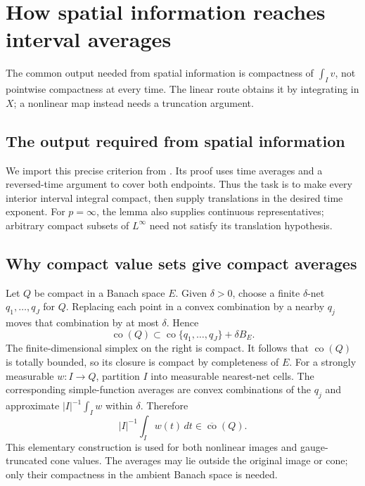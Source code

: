 \documentclass[12pt,reqno]{amsart}
\begin{document}
\section{How spatial information reaches interval averages}
The common output needed from spatial information is compactness of $\int_Iv$, not pointwise compactness at every time. The linear route obtains it by integrating in $X$; a nonlinear map instead needs a truncation argument.
\subsection{The output required from spatial information}
\begin{lemma}[Simon]\label{lem:criterion}

\end{lemma}
We import this precise criterion from \cite[Theorem 1, pp.~71--73]{S-simon}. Its proof uses time averages and a reversed-time argument to cover both endpoints. Thus the task is to make every interior interval integral compact, then supply translations in the desired time exponent. For $p=\infty$, the lemma also supplies continuous representatives; arbitrary compact subsets of $L^\infty$ need not satisfy its translation hypothesis.
\subsection{Why compact value sets give compact averages}
Let $Q$ be compact in a Banach space $E$. Given $\delta>0$, choose a finite $\delta$-net $q_1,\ldots,q_J$ for $Q$. Replacing each point in a convex combination by a nearby $q_j$ moves that combination by at most $\delta$. Hence
\[
\operatorname{co}(Q)\subset \operatorname{co}\{q_1,\ldots,q_J\}+\delta B_E.
\]
The finite-dimensional simplex on the right is compact. It follows that $\operatorname{co}(Q)$ is totally bounded, so its closure is compact by completeness of $E$.
For a strongly measurable $w:I\to Q$, partition $I$ into measurable nearest-net cells. The corresponding simple-function averages are convex combinations of the $q_j$ and approximate $|I|^{-1}\int_Iw$ within $\delta$. Therefore
\[
|I|^{-1}\int_I w(t)\,dt\in\overline{\operatorname{co}}(Q).
\]
This elementary construction is used for both nonlinear images and gauge-truncated cone values. The averages may lie outside the original image or cone; only their compactness in the ambient Banach space is needed.
\end{document}
